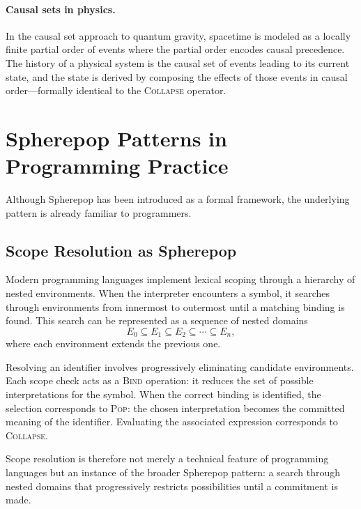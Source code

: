 \documentclass[12pt]{article}
\begin{document}
\paragraph{Causal sets in physics.} In the causal set approach to quantum gravity, spacetime is modeled as a locally finite partial order of events where the partial order encodes causal precedence. The history of a physical system is the causal set of events leading to its current state, and the state is derived by composing the effects of those events in causal order---formally identical to the \textsc{Collapse} operator.

\section{Spherepop Patterns in Programming Practice}
\label{sec:programming}

Although Spherepop has been introduced as a formal framework, the underlying pattern is already familiar to programmers.

\subsection{Scope Resolution as Spherepop}

Modern programming languages implement lexical scoping through a hierarchy of nested environments. When the interpreter encounters a symbol, it searches through environments from innermost to outermost until a matching binding is found. This search can be represented as a sequence of nested domains
\[
E_0 \subseteq E_1 \subseteq E_2 \subseteq \cdots \subseteq E_n,
\]
where each environment extends the previous one.

Resolving an identifier involves progressively eliminating candidate environments. Each scope check acts as a \textsc{Bind} operation: it reduces the set of possible interpretations for the symbol. When the correct binding is identified, the selection corresponds to \textsc{Pop}: the chosen interpretation becomes the committed meaning of the identifier. Evaluating the associated expression corresponds to \textsc{Collapse}.

Scope resolution is therefore not merely a technical feature of programming languages but an instance of the broader Spherepop pattern: a search through nested domains that progressively restricts possibilities until a commitment is made.
\end{document}
